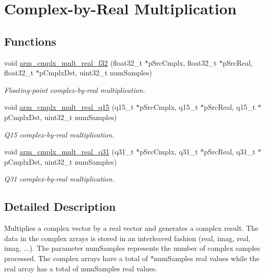 \hypertarget{group__CmplxByRealMult}{}\section{Complex-\/by-\/\+Real Multiplication}
\label{group__CmplxByRealMult}
\subsection*{Functions}
\begin{DoxyCompactItemize}
\item 
void \hyperlink{group__CmplxByRealMult_ga9c18616f56cb4d3c0889ce0b339221ca}{arm\+\_\+cmplx\+\_\+mult\+\_\+real\+\_\+f32} (float32\+\_\+t $\ast$p\+Src\+Cmplx, float32\+\_\+t $\ast$p\+Src\+Real, float32\+\_\+t $\ast$p\+Cmplx\+Dst, uint32\+\_\+t num\+Samples)
\begin{DoxyCompactList}\small\item\em Floating-\/point complex-\/by-\/real multiplication. \end{DoxyCompactList}\item 
void \hyperlink{group__CmplxByRealMult_ga3bd8889dcb45980e1d3e53344df54e85}{arm\+\_\+cmplx\+\_\+mult\+\_\+real\+\_\+q15} (q15\+\_\+t $\ast$p\+Src\+Cmplx, q15\+\_\+t $\ast$p\+Src\+Real, q15\+\_\+t $\ast$p\+Cmplx\+Dst, uint32\+\_\+t num\+Samples)
\begin{DoxyCompactList}\small\item\em Q15 complex-\/by-\/real multiplication. \end{DoxyCompactList}\item 
void \hyperlink{group__CmplxByRealMult_ga715e4bb8e945b8ca51ec5237611697ce}{arm\+\_\+cmplx\+\_\+mult\+\_\+real\+\_\+q31} (q31\+\_\+t $\ast$p\+Src\+Cmplx, q31\+\_\+t $\ast$p\+Src\+Real, q31\+\_\+t $\ast$p\+Cmplx\+Dst, uint32\+\_\+t num\+Samples)
\begin{DoxyCompactList}\small\item\em Q31 complex-\/by-\/real multiplication. \end{DoxyCompactList}\end{DoxyCompactItemize}


\subsection{Detailed Description}
Multiplies a complex vector by a real vector and generates a complex result. The data in the complex arrays is stored in an interleaved fashion (real, imag, real, imag, ...). The parameter {\ttfamily num\+Samples} represents the number of complex samples processed. The complex arrays have a total of {$\ast$num\+Samples} real values while the real array has a total of {\ttfamily num\+Samples} real values.

